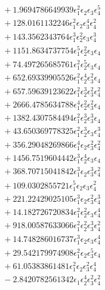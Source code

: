 \documentclass[10pt]{article}
\begin{document}
\begin{align*}
&{}  + 1.9694786649939 \epsilon_{1}^{2} \epsilon_{2} \epsilon_{3} \epsilon_{4}^{5} \\
&{}  + 128.0161132246 \epsilon_{1}^{2} \epsilon_{2} \epsilon_{3}^{4} \epsilon_{4}^{2} \\
&{}  + 143.3562343764 \epsilon_{1}^{3} \epsilon_{2}^{2} \epsilon_{3} \epsilon_{4}^{3} \\
&{}  + 1151.8634737754 \epsilon_{1}^{5} \epsilon_{2}^{2} \epsilon_{3} \epsilon_{4} \\
&{}  + 74.497265685761 \epsilon_{1}^{2} \epsilon_{2}^{5} \epsilon_{3} \epsilon_{4} \\
&{}  + 652.69339905526 \epsilon_{1}^{2} \epsilon_{2}^{4} \epsilon_{3}^{2} \epsilon_{4} \\
&{}  + 657.59639123622 \epsilon_{1}^{2} \epsilon_{2}^{3} \epsilon_{3}^{2} \epsilon_{4}^{2} \\
&{}  + 2666.4785634788 \epsilon_{1}^{4} \epsilon_{2}^{2} \epsilon_{3}^{2} \epsilon_{4} \\
&{}  + 1382.4307584494 \epsilon_{1}^{2} \epsilon_{2}^{3} \epsilon_{3}^{3} \epsilon_{4} \\
&{}  + 43.650369778325 \epsilon_{1}^{2} \epsilon_{2}^{3} \epsilon_{3} \epsilon_{4}^{3} \\
&{}  + 356.29048269866 \epsilon_{1}^{4} \epsilon_{2} \epsilon_{3}^{2} \epsilon_{4}^{2} \\
&{}  + 1456.7519604442 \epsilon_{1}^{3} \epsilon_{2}^{4} \epsilon_{3} \epsilon_{4} \\
&{}  + 368.70715041842 \epsilon_{1}^{3} \epsilon_{2} \epsilon_{3}^{3} \epsilon_{4}^{2} \\
&{}  + 109.0302855721 \epsilon_{1}^{5} \epsilon_{2} \epsilon_{3} \epsilon_{4}^{2} \\
&{}  + 221.22429025105 \epsilon_{1}^{3} \epsilon_{2} \epsilon_{3}^{2} \epsilon_{4}^{3} \\
&{}  + 14.182726720834 \epsilon_{1}^{2} \epsilon_{2}^{2} \epsilon_{3} \epsilon_{4}^{4} \\
&{}  + 918.00587633066 \epsilon_{1}^{2} \epsilon_{2}^{2} \epsilon_{3}^{3} \epsilon_{4}^{2} \\
&{}  + 14.748286016737 \epsilon_{1}^{3} \epsilon_{2} \epsilon_{3} \epsilon_{4}^{4} \\
&{}  + 29.542179974908 \epsilon_{1}^{2} \epsilon_{2} \epsilon_{3}^{5} \epsilon_{4} \\
&{}  + 61.05383861481 \epsilon_{1}^{2} \epsilon_{2} \epsilon_{3}^{2} \epsilon_{4}^{4} \\
&{}  - 2.8420782561342 \epsilon_{1} \epsilon_{2}^{4} \epsilon_{3}^{2} \epsilon_{4}^{2} \\

\end{align*}
\end{document}
